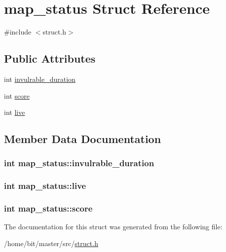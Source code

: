 \hypertarget{structmap__status}{\section{map\-\_\-status Struct Reference}
\label{structmap__status}
}


{\ttfamily \#include $<$struct.\-h$>$}

\subsection*{Public Attributes}
\begin{DoxyCompactItemize}
\item 
int \hyperlink{structmap__status_a3053ab37daa828a42c0895396ddb9c9a}{invulrable\-\_\-duration}
\item 
int \hyperlink{structmap__status_a80a390831c96c889cdce8e9e118ae7f6}{score}
\item 
int \hyperlink{structmap__status_a1e75d0d686fefa9c4ffadd5aa59723c5}{live}
\end{DoxyCompactItemize}


\subsection{Member Data Documentation}
\hypertarget{structmap__status_a3053ab37daa828a42c0895396ddb9c9a}{
\subsubsection[{invulrable\-\_\-duration}]{\setlength{\rightskip}{0pt plus 5cm}int map\-\_\-status\-::invulrable\-\_\-duration}}\label{structmap__status_a3053ab37daa828a42c0895396ddb9c9a}
\hypertarget{structmap__status_a1e75d0d686fefa9c4ffadd5aa59723c5}{
\subsubsection[{live}]{\setlength{\rightskip}{0pt plus 5cm}int map\-\_\-status\-::live}}\label{structmap__status_a1e75d0d686fefa9c4ffadd5aa59723c5}
\hypertarget{structmap__status_a80a390831c96c889cdce8e9e118ae7f6}{
\subsubsection[{score}]{\setlength{\rightskip}{0pt plus 5cm}int map\-\_\-status\-::score}}\label{structmap__status_a80a390831c96c889cdce8e9e118ae7f6}


The documentation for this struct was generated from the following file\-:\begin{DoxyCompactItemize}
\item 
/home/bit/master/src/\hyperlink{struct_8h}{struct.\-h}\end{DoxyCompactItemize}
